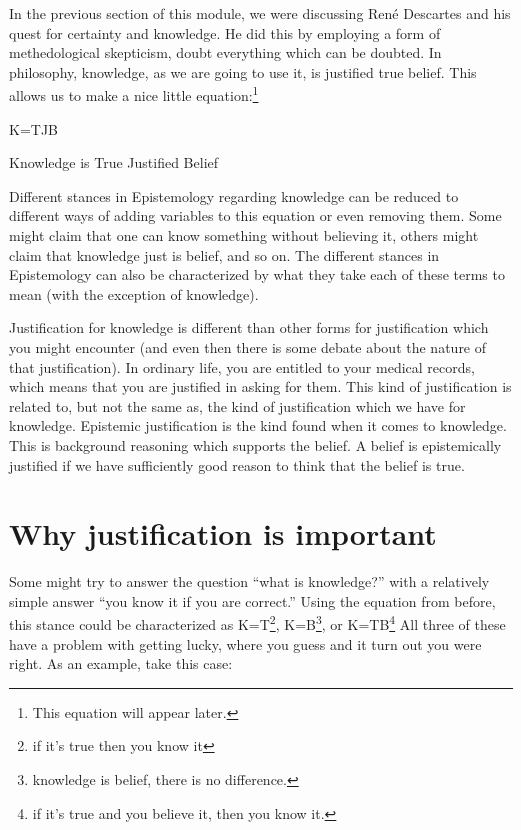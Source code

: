 In the previous section of this module, we were discussing Ren\'e Descartes and his quest for certainty and knowledge. He did this by employing a form of methedological skepticism, doubt everything which can be doubted. In philosophy, \gls{knowledge}, as we are going to use it, is justified true belief. This allows us to make a nice little equation:\footnote{This equation will appear later.}

\begin{center}

K=TJB

Knowledge is True Justified Belief
\end{center}

Different stances in Epistemology regarding knowledge can be reduced to different ways of adding variables to this equation or even removing them. Some might claim that one can know something without believing it, others might claim that knowledge just is belief, and so on. The different stances in Epistemology can also be characterized by what they take each of these terms to mean (with the exception of knowledge). 

Justification for knowledge is different than other forms for justification which you might encounter (and even then there is some debate about the nature of that justification). In ordinary life, you are entitled to your medical records, which means that you are justified in asking for them. This kind of justification is related to, but not the same as, the kind of justification which we have for knowledge. Epistemic justification is the kind found when it comes to knowledge. This is background reasoning which supports the belief. A belief is epistemically justified if we have sufficiently good reason to think that the belief is true. 
\section{Why justification is important}

Some might try to answer the question ``what is knowledge?'' with a relatively simple answer ``you know it if you are correct.'' Using the equation from before, this stance could be characterized as K=T\footnote{if it's true then you know it}, K=B\footnote{knowledge is belief, there is no difference.}, or  K=TB\footnote{if it's true and you believe it, then you know it.} All three of these have a problem with getting lucky, where you guess and it turn out you were right. As an example, take this case:

